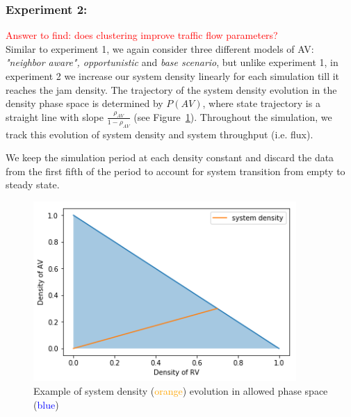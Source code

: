\documentclass[oneside,letter,11pt]{article}
\begin{document}
\subsubsection{\textbf{Experiment 2:}}
\textcolor{red}{Answer to find: does clustering improve traffic flow parameters? \\}
Similar to experiment 1, we again consider three different models of AV: \textit{"neighbor aware", opportunistic} and \textit{base scenario}, but unlike experiment 1, in experiment 2 we increase our system density linearly for each simulation till it reaches the jam density. The trajectory of the system density evolution in the density phase space is determined by $P(AV)$, where state trajectory is a straight line with slope $\frac{\rho_{AV}}{1-\rho_{AV}}$ (see Figure~\ref{fig:lane}). Throughout the simulation, we track this evolution of system density and system throughput (i.e. flux).

We keep the simulation period at each density constant and discard the data from the first fifth of the period to account for system transition from empty to steady state. 
\begin{figure}[H]
\centering
  \includegraphics[width= 10cm]{phase1.png}
  \vspace{-0.3cm}
  \caption{Example of system density (\textcolor{orange}{orange}) evolution in allowed phase space (\textcolor{blue}{blue})}
    \vspace{-0.2cm}
  \label{fig:lane}
\end{figure}
\end{document}
